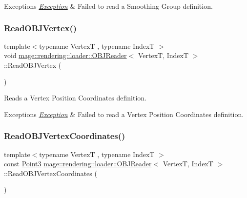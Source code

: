 \begin{DoxyExceptions}{Exceptions}
{\em \hyperlink{classmage_1_1_exception}{Exception}} & Failed to read a Smoothing Group definition. \\
\hline
\end{DoxyExceptions}
\hypertarget{classmage_1_1rendering_1_1loader_1_1_o_b_j_reader_a0f6e0d744b2baf94bca4dfda6c2cc194}{}\label{classmage_1_1rendering_1_1loader_1_1_o_b_j_reader_a0f6e0d744b2baf94bca4dfda6c2cc194} 
\subsubsection{\texorpdfstring{Read\+O\+B\+J\+Vertex()}{ReadOBJVertex()}}
{\footnotesize\ttfamily template$<$typename VertexT , typename IndexT $>$ \\
void \hyperlink{classmage_1_1rendering_1_1loader_1_1_o_b_j_reader}{mage\+::rendering\+::loader\+::\+O\+B\+J\+Reader}$<$ VertexT, IndexT $>$\+::Read\+O\+B\+J\+Vertex (\begin{DoxyParamCaption}{ }\end{DoxyParamCaption})\hspace{0.3cm}{\ttfamily [private]}}

Reads a Vertex Position Coordinates definition.


\begin{DoxyExceptions}{Exceptions}
{\em \hyperlink{classmage_1_1_exception}{Exception}} & Failed to read a Vertex Position Coordinates definition. \\
\hline
\end{DoxyExceptions}
\hypertarget{classmage_1_1rendering_1_1loader_1_1_o_b_j_reader_a2c5d954441d64b982d7a89df9171edbc}{}\label{classmage_1_1rendering_1_1loader_1_1_o_b_j_reader_a2c5d954441d64b982d7a89df9171edbc} 
\subsubsection{\texorpdfstring{Read\+O\+B\+J\+Vertex\+Coordinates()}{ReadOBJVertexCoordinates()}}
{\footnotesize\ttfamily template$<$typename VertexT , typename IndexT $>$ \\
const \hyperlink{structmage_1_1_point3}{Point3} \hyperlink{classmage_1_1rendering_1_1loader_1_1_o_b_j_reader}{mage\+::rendering\+::loader\+::\+O\+B\+J\+Reader}$<$ VertexT, IndexT $>$\+::Read\+O\+B\+J\+Vertex\+Coordinates (\begin{DoxyParamCaption}{ }\end{DoxyParamCaption})\hspace{0.3cm}{\ttfamily [private]}}

